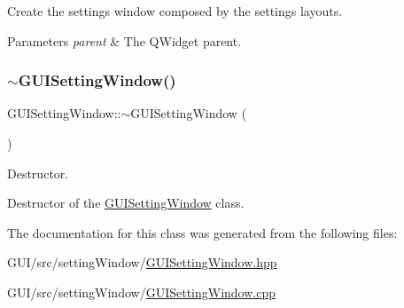 Create the settings window composed by the settings layouts. 


\begin{DoxyParams}{Parameters}
{\em parent} & The Q\+Widget parent. \\
\hline
\end{DoxyParams}
\mbox{\label{class_g_u_i_setting_window_abe96df392b79d922f4b688fe8a6cfb10}} 
\subsubsection{\texorpdfstring{$\sim$\+G\+U\+I\+Setting\+Window()}{~GUISettingWindow()}}
{\footnotesize\ttfamily G\+U\+I\+Setting\+Window\+::$\sim$\+G\+U\+I\+Setting\+Window (\begin{DoxyParamCaption}{ }\end{DoxyParamCaption})}



Destructor. 

Destructor of the \mbox{\hyperlink{class_g_u_i_setting_window}{G\+U\+I\+Setting\+Window}} class. 

The documentation for this class was generated from the following files\+:\begin{DoxyCompactItemize}
\item 
G\+U\+I/src/setting\+Window/\mbox{\hyperlink{_g_u_i_setting_window_8hpp}{G\+U\+I\+Setting\+Window.\+hpp}}\item 
G\+U\+I/src/setting\+Window/\mbox{\hyperlink{_g_u_i_setting_window_8cpp}{G\+U\+I\+Setting\+Window.\+cpp}}\end{DoxyCompactItemize}
